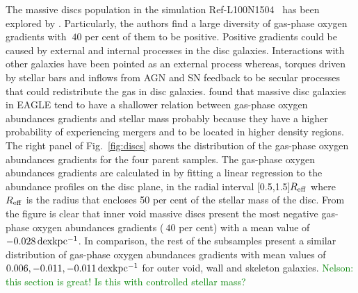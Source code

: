 \documentclass[a4paper,fleqn,usenatbib,letter]{mnras}
\newcommand{\REF}{Ref-L100N1504}
\begin{document}
The massive discs population in the simulation \REF~ has been explored by \cite{tissera2019}. Particularly, the authors find a large diversity of  gas-phase oxygen  gradients with $~ 40$ per cent of them  to be positive. Positive gradients could be caused by external and internal processes in the disc galaxies. Interactions with other galaxies have been pointed as an external process  whereas, torques driven by stellar bars and inflows from AGN and SN feedback to be secular processes that could redistribute the gas in disc galaxies. 
\cite{tissera2019} found that  massive disc galaxies in EAGLE tend to have a shallower relation between gas-phase oxygen abundances gradients and  stellar mass  probably because they have a higher probability of experiencing mergers and to be located in higher density regions. The right panel of  Fig.~\ref{fig:discs} shows the distribution of the gas-phase oxygen abundances gradients for the four parent samples.   The gas-phase oxygen abundances gradients  are  calculated in  \citet{tissera2019} by fitting a linear regression to the abundance profiles on the disc plane, in the radial interval [0.5,1.5]$R_{\rm eff}$ where $R_{\rm eff}$ is the radius that encloses 50 per cent of the stellar mass of the disc.  From the figure is clear that  inner void massive discs present the most negative gas-phase oxygen abundances gradients ($~ 40$ per cent) with a mean value of $-0.028\, \rm dex kpc^{-1}$. In comparison, the rest of the subsamples present a similar distribution of gas-phase oxygen abundances gradients with mean values of $0.006,-0.011,-0.011\, \rm dex kpc^{-1}$ for outer void, wall and skeleton galaxies.  \textcolor{green}{Nelson: this section is great!  Is this with controlled stellar mass?}
\end{document}
